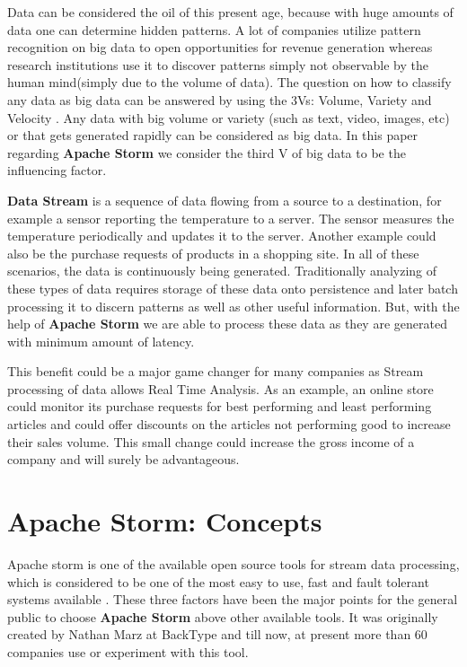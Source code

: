 \documentclass[runningheads,a4paper]{llncs}[2015/06/24]
\begin{document}
Data can be considered the oil of this present age, because with huge amounts of data one can determine hidden patterns. A lot of companies utilize pattern recognition on big data to open opportunities for revenue generation whereas research institutions use it to discover patterns simply not observable by the human mind(simply due to the volume of data). The question on how to classify any data as big data can be answered by using the 3Vs: Volume, Variety and Velocity \cite{usingapachestorm}. Any data with big volume or variety (such as text, video, images, etc) or that gets generated rapidly can be considered as big data. In this paper regarding \textbf{Apache Storm} we consider the third V of big data to be the influencing factor.

\textbf{Data Stream} is a sequence of data flowing from a source to a destination, for example a sensor reporting the temperature to a server. The sensor measures the temperature periodically and updates it to the server. Another example could also be the purchase requests of products in a shopping site. In all of these scenarios, the data is continuously being generated. Traditionally analyzing of these types of data requires storage of these data onto persistence and later batch processing it to discern patterns as well as other useful information. But, with the help of \textbf{Apache Storm} we are able to process these data as they are generated with minimum amount of latency.

This benefit could be a major game changer for many companies as Stream processing of data allows Real Time Analysis. As an example, an online store could monitor its purchase requests for best performing and least performing articles and could offer discounts on the articles not performing good to increase their sales volume. This small change could increase the gross income of a company and will surely be advantageous.

\section{Apache Storm: Concepts}
\label{sec:concepts}

Apache storm is one of the available open source tools for stream data processing, which is considered to be one of the most easy to use, fast and fault tolerant systems available \cite{stormperspective}. These three factors have been the major points for the general public to choose \textbf{Apache Storm} above other available tools. It was originally created by Nathan Marz at BackType and till now, at present more than 60 companies use or experiment with this tool.
\end{document}
